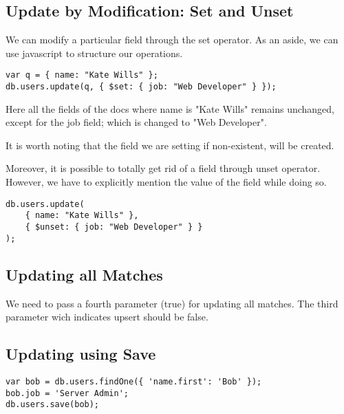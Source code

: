 \documentclass[a4paper, 12pt]{article}
\begin{document}
\subsection{Update by Modification: Set and Unset}
We can modify a particular field through the set operator. As an aside, we can use javascript to structure our operations.
\begin{verbatim}
var q = { name: "Kate Wills" };
db.users.update(q, { $set: { job: "Web Developer" } });
\end{verbatim}
Here all the fields of the docs where name is "Kate Wills" remains unchanged, except for the job field; which is changed to "Web Developer".

It is worth noting that the field we are setting if non-existent, will be created.

Moreover, it is possible to totally get rid of a field through unset operator. However, we have to explicitly mention the value of the field while doing so.
\begin{verbatim}
db.users.update(
    { name: "Kate Wills" },
    { $unset: { job: "Web Developer" } }
);
\end{verbatim}
\subsection{Updating all Matches}
We need to pass a fourth parameter (true) for updating all matches. The third parameter wich indicates upsert should be false.
\subsection{Updating using Save}
\begin{verbatim}
var bob = db.users.findOne({ 'name.first': 'Bob' });
bob.job = 'Server Admin';
db.users.save(bob);
\end{verbatim}
\end{document}
